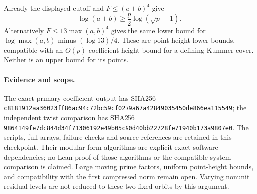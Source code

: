 Already the displayed cutoff and $F\le(a+b)^4$ give
\[
 \log(a+b)\ge\frac p2\log(\sqrt p-1).
\]
Alternatively $F\le13\max(a,b)^4$ gives the same lower bound for
$\log\max(a,b)$ minus $(\log13)/4$. These are point-height lower
bounds, compatible with an $O(p)$ coefficient-height bound for a
defining Kummer cover. Neither is an upper bound for its points.

\paragraph{Evidence and scope.}
The exact primary coefficient output has SHA256
\texttt{c8181912aa36023f\allowbreak f86ac94c72bc59cf\allowbreak 0279a67a42849035\allowbreak 450de866ea115549};
the independent twist comparison has SHA256
\texttt{9864149fe7dc844d\allowbreak 34f71306192e49b0\allowbreak 5c90d40bb22728fe\allowbreak 71940b173a9807e0}.
The scripts, full arrays, failure checks and source references are
retained in this checkpoint. Their modular-form algorithms are
explicit exact-software dependencies; no Lean proof of those algorithms
or the compatible-system comparison is claimed. Large moving prime
factors, uniform point-height bounds, and compatibility with the first
compressed norm remain open. Varying nonunit residual levels are not
reduced to these two fixed orbits by this argument.
